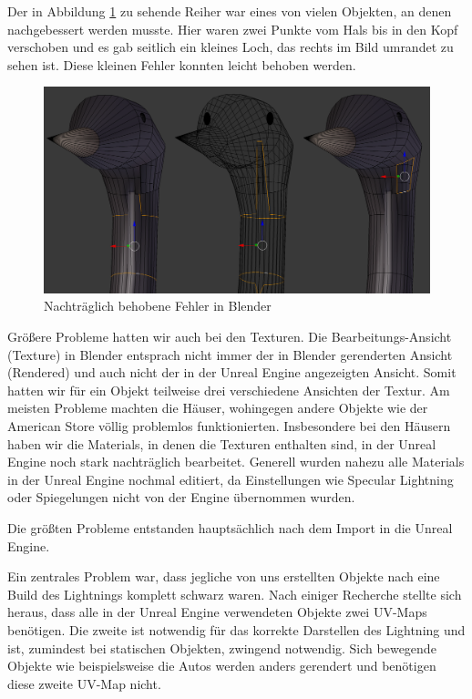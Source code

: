\documentclass{Bericht}
\begin{document}
			Der in Abbildung \ref{img:heron-error} zu sehende Reiher war eines von vielen Objekten, an denen nachgebessert werden musste. Hier waren zwei Punkte vom Hals bis in den Kopf verschoben und es gab seitlich ein kleines Loch, das rechts im Bild umrandet zu sehen ist. Diese kleinen Fehler konnten leicht behoben werden. 

		\begin{figure}[!htbp] %
			\centering
			\includegraphics[height=\textheight, width=\linewidth, keepaspectratio, angle=0]{../Bilder/Heron_Problem.png} %
			\caption{Nachträglich behobene Fehler in Blender}
			\label{img:heron-error}
		\end{figure}
			
			Größere Probleme hatten wir auch bei den Texturen. Die Bearbeitungs-Ansicht (Texture) in Blender entsprach nicht immer der in Blender gerenderten Ansicht (Rendered) und auch nicht der in der Unreal Engine angezeigten Ansicht. Somit hatten wir für ein Objekt teilweise drei verschiedene Ansichten der Textur. Am meisten Probleme machten die Häuser, wohingegen andere Objekte wie der American Store völlig problemlos funktionierten. Insbesondere bei den Häusern haben wir die Materials, in denen die Texturen enthalten sind, in der Unreal Engine noch stark nachträglich bearbeitet.
			Generell wurden nahezu alle Materials in der Unreal Engine nochmal editiert, da Einstellungen wie Specular Lightning oder Spiegelungen nicht von der Engine übernommen wurden.
			
			
			
Die größten Probleme entstanden hauptsächlich nach dem Import in die Unreal Engine. 

			Ein zentrales Problem war, dass jegliche von uns erstellten Objekte nach eine Build des Lightnings komplett schwarz waren. Nach einiger Recherche stellte sich heraus, dass alle in der Unreal Engine verwendeten Objekte zwei UV-Maps benötigen. Die zweite ist notwendig für das korrekte Darstellen des Lightning und ist, zumindest bei statischen Objekten, zwingend notwendig. Sich bewegende Objekte wie beispielsweise die Autos werden anders gerendert und benötigen diese zweite UV-Map nicht. 
		
\end{document}
